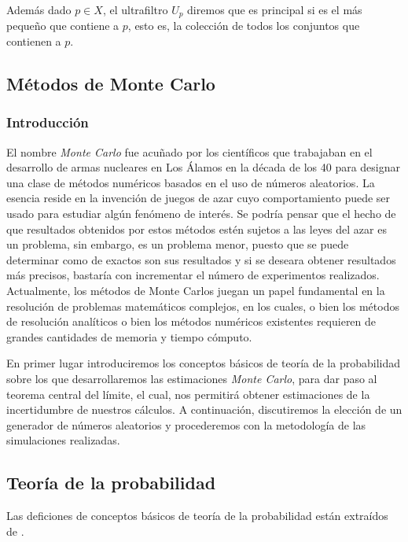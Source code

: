 \documentclass[../proyecto.tex]{memoir}
\begin{document}
Además dado $p \in X$, el ultrafiltro $U_{p}$ diremos que es principal si es el más pequeño que contiene a $p$, esto es, la colección de todos los conjuntos que contienen a $p$.

\subsection{Métodos de Monte Carlo}

\subsubsection{Introducción}

El nombre \textit{Monte Carlo} fue acuñado por los científicos que trabajaban en el desarrollo de armas nucleares en Los Álamos en la década de los 40 para designar una clase de métodos numéricos basados en el uso de números aleatorios. La esencia reside en la invención de juegos de azar cuyo comportamiento puede ser usado para estudiar algún fenómeno de interés. Se podría pensar que el hecho de que resultados obtenidos por estos métodos estén sujetos a las leyes del azar es un problema, sin embargo, es un problema menor, puesto que se puede determinar como de exactos son sus resultados y si se deseara obtener resultados más precisos, bastaría con incrementar el número de experimentos realizados. Actualmente, los métodos de Monte Carlos juegan un papel fundamental en la resolución de problemas matemáticos complejos, en los cuales, o bien los métodos de resolución analíticos o bien los métodos numéricos existentes requieren de grandes cantidades de memoria y tiempo cómputo.

En primer lugar introduciremos los conceptos básicos de teoría de la probabilidad sobre los que desarrollaremos las estimaciones \textit{Monte Carlo}, para dar paso al teorema central del límite, el cual, nos permitirá obtener estimaciones de la incertidumbre de nuestros cálculos. A continuación, discutiremos la elección de un generador de números aleatorios y procederemos con la metodología de las simulaciones realizadas.

\subsection{Teoría de la probabilidad}

 
Las deficiones de conceptos básicos de teoría de la probabilidad están extraídos de \cite{proman}. 
\end{document}
